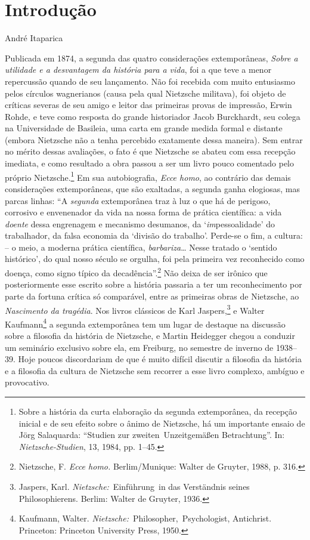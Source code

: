 \chapter{Introdução}{}{André Itaparica}\label{introduuxe7uxe3o}


Publicada em 1874, a segunda das quatro considerações extemporâneas,
\emph{Sobre a utilidade e a desvantagem da história para a vida}, foi a
que teve a menor repercussão quando de seu lançamento. Não foi recebida
com muito entusiasmo pelos círculos wagnerianos (causa pela qual
Nietzsche militava), foi objeto de críticas severas de seu amigo e
leitor das primeiras provas de impressão, Erwin Rohde, e teve como
resposta do grande historiador Jacob Burckhardt, seu colega na
Universidade de Basileia, uma carta em grande medida formal e distante
(embora Nietzsche não a tenha percebido exatamente dessa maneira). Sem
entrar no mérito dessas avaliações, o fato é que Nietzsche se abateu com
essa recepção imediata, e como resultado a obra passou a ser um livro
pouco comentado pelo próprio Nietzsche.\footnote{Sobre a história da
  curta elaboração da segunda extemporânea, da recepção inicial e de seu
  efeito sobre o ânimo de Nietzsche, há um importante ensaio de Jörg
  Salaquarda: ``Studien zur zweiten~Unzeitgemäßen Betrachtung''. In:
  \emph{Nietzsche-Studien}, 13, 1984, pp. 1--45.} Em sua autobiografia,
\emph{Ecce homo}, ao contrário das demais considerações extemporâneas,
que são exaltadas, a segunda ganha elogiosas, mas parcas linhas: ``A
\emph{segunda} extemporânea traz à luz o que há de perigoso, corrosivo e
envenenador da vida na nossa forma de prática científica: a vida
\emph{doente} dessa engrenagem e mecanismo desumanos, da
`\emph{im}pessoalidade' do trabalhador, da falsa economia da `divisão
do trabalho'. Perde-se o fim, a cultura: -- o meio, a moderna prática
científica, \emph{barbariza}\ldots{} Nesse tratado o `sentido histórico', do
qual nosso século se orgulha, foi pela primeira vez reconhecido como
doença, como signo típico da decadência''.\footnote{Nietzsche, F.
  \emph{Ecce homo.} Berlim/Munique: Walter de Gruyter, 1988, p. 316.}
Não deixa de ser irônico que posteriormente esse escrito sobre a
história passaria a ter um reconhecimento por parte da fortuna crítica
só comparável, entre as primeiras obras de Nietzsche, ao
\emph{Nascimento da tragédia}. Nos livros clássicos de Karl
Jaspers,\footnote{Jaspers, Karl. \emph{Nietzsche:}~Einführung~in das 
Verständnis seines Philosophierens. Berlim: Walter de Gruyter, 1936.} 
e Walter Kaufmann\footnote{Kaufmann, Walter.
  \emph{Nietzsche:}~Philosopher,~Psychologist,
  Antichrist. Princeton: Princeton University Press, 1950.} a
segunda extemporânea tem um lugar de destaque na discussão sobre a
filosofia da história de Nietzsche, e Martin Heidegger chegou a conduzir
um seminário exclusivo sobre ela, em Freiburg, no semestre de inverno de
1938--39. Hoje poucos discordariam de que é muito difícil discutir a
filosofia da história e a filosofia da cultura de Nietzsche sem recorrer
a esse livro complexo, ambíguo e provocativo.

